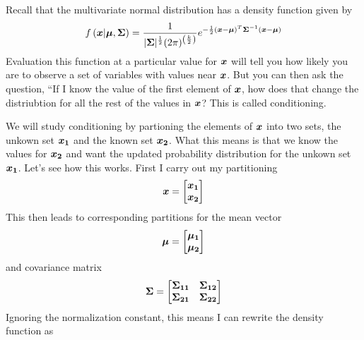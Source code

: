 \documentclass[../../main.tex]{subfiles}
\begin{document}
Recall that the multivariate normal distribution has a density function given
by
\begin{equation}
    f\left(\boldsymbol{x}| \boldsymbol{\mu}, \boldsymbol{\Sigma} \right)
    = \frac{1}{
            |\boldsymbol{\Sigma}|^\frac{1}{2} (2\pi)^{\left(\frac{k}{2}\right)}
        }
        e^{
            -\frac{1}{2}
            (\boldsymbol{x} - \boldsymbol{\mu})^T
            \boldsymbol{\Sigma}^{-1}
            (\boldsymbol{x} - \boldsymbol{\mu})
    }
\end{equation}
Evaluation this function at a particular value for $\boldsymbol{x}$ will tell you how
likely you are to observe a set of variables with values near $\boldsymbol{x}$. But you
can then ask the question, ``If I know the value of the first element of
$\boldsymbol{x}$, how does that change the distriubtion for all the rest of the values
in $\boldsymbol{x}$?  This is called conditioning.

We will study conditioning by partioning the elements of $\boldsymbol{x}$ into two
sets, the unkown set $\boldsymbol{x_1}$ and the known set $\boldsymbol{x_2}$.  What this means
is that we know the values for $\boldsymbol{x_2}$ and want the updated probability
distribution for the unkown set $\boldsymbol{x_1}$. Let's see how this works.  First I
carry out my partitioning
\begin{equation}
    \label{eq:xpartition}
    \boldsymbol{x} = 
    \begin{bmatrix}
        \boldsymbol{x_1} \\
        \boldsymbol{x_2}
    \end{bmatrix}
\end{equation}
This then leads to corresponding partitions for the mean vector
\begin{equation}
    \label{eq:meanpartition}
    \boldsymbol{\mu} = 
    \begin{bmatrix}
        \boldsymbol{\mu_1} \\
        \boldsymbol{\mu_2}
    \end{bmatrix}
\end{equation}
and covariance matrix
\begin{equation}
    \label{eq:meanpartition}
    \boldsymbol{\Sigma} = 
    \begin{bmatrix}
        \boldsymbol{\Sigma_{11}} & \boldsymbol{\Sigma_{12}} \\ 
        \boldsymbol{\Sigma_{21}} & \boldsymbol{\Sigma_{22}} \\
    \end{bmatrix}
\end{equation}
Ignoring the normalization constant, this means I can rewrite the density
function as
\end{document}
